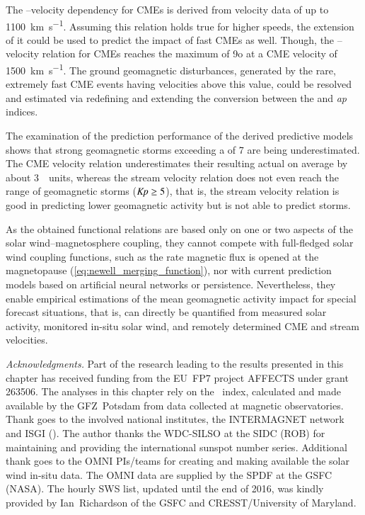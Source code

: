 The \Kp--velocity dependency for CMEs is derived from velocity data of up to \SI{1100}{\km\per\s}. Assuming this relation holds true for higher speeds, the extension of it could be used to predict the \Kp{} impact of fast CMEs as well. Though, the \Kp--velocity relation for CMEs reaches the maximum \Kp{} of 9o at a CME velocity of \SI{1500}{\km\per\s}. The ground geomagnetic disturbances, generated by the rare, extremely fast CME events having velocities above this value, could be resolved and estimated via redefining and extending the conversion between the \Kp{} and \textit{ap} indices.

The examination of the prediction performance of the derived predictive models shows that strong geomagnetic storms exceeding a \Kp{} of 7 are being underestimated. The CME velocity relation underestimates their resulting actual \Kp{} on average by about 3~\Kp~units, whereas the stream velocity relation does not even reach the range of geomagnetic storms ($\text{\textit{Kp}} \geq 5$), that is, the stream velocity relation is good in predicting lower geomagnetic activity but is not able to predict storms.

As the obtained functional relations are based only on one or two aspects of the solar wind--magnetosphere coupling, they cannot compete with full-fledged solar wind coupling functions, such as the rate magnetic flux is opened at the magnetopause (\autoref{eq:newell_merging_function}), nor with current prediction models based on artificial neural networks or \Kp{} persistence. Nevertheless, they enable empirical estimations of the mean geomagnetic activity impact for special forecast situations, that is, \Kp{} can directly be quantified from measured solar activity, monitored in-situ solar wind, and remotely determined CME and stream velocities.



\bigskip
{\small
\noindent \textit{Acknowledgments.} Part of the research leading to the results presented in this chapter has received funding from the EU~FP7 project AFFECTS under grant 263506.
The analyses in this chapter rely on the \Kp~index, calculated and made available by the GFZ~Potsdam from data collected at magnetic observatories. Thank goes to the involved national institutes, the INTERMAGNET network and ISGI (). The author thanks the WDC-SILSO at the SIDC (ROB) for maintaining and providing the international sunspot number series. Additional thank goes to the OMNI PIs/teams for creating and making available the solar wind in-situ data. The OMNI data are supplied by the SPDF at the GSFC (NASA). The hourly SWS list, updated until the end of 2016, was kindly provided by Ian~Richardson of the GSFC and CRESST/University of Maryland.
}

